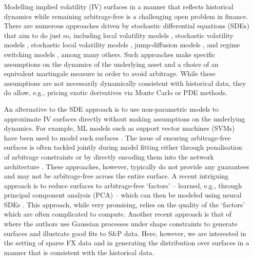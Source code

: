\documentclass[onefignum,onetabnum]{siamonline190516}
\begin{document}
Modelling implied volatility (IV) surfaces %
in a manner that reflects historical dynamics while remaining arbitrage-free is a challenging open problem in finance. There are numerous approaches driven by stochastic differential equations (SDEs) that aim to do just so, including local volatility models  \cite{dupire1994pricing}, stochastic volatility models \cite{heston1993closed,hagan2002managing}, stochastic local volatility models \cite{said1999pricing}, jump-diffusion models \cite{cont2002calibration}, and regime switching models \cite{buffington2002regime}, among many others. Such approaches make specific assumptions on the dynamics of the underlying asset  and a choice of an equivalent martingale measure in order to avoid arbitrage. While these assumptions are not necessarily dynamically consistent with historical data, they do allow, e.g., pricing exotic derivatives via Monte Carlo or PDE methods.

An alternative to the SDE  approach is to use  non-parametric models to approximate IV surfaces directly without making assumptions on the underlying dynamics. For example, ML models such as support vector machines (SVMs) have been used to model such surfaces \cite{zeng2019online}. The issue of ensuring arbitrage-free surfaces is often tackled jointly during model fitting \cite{bergeron2021autoencoders} either through penalisation of arbitrage constraints \cite{ackerer2020deep} or by directly encoding them into the network architecture \cite{zheng2019gated}. These approaches, however, typically do not provide any guarantees and may not be arbitrage-free across the entire surface. A recent intriguing approach \cite{cohen2021arbitrage} is to reduce surfaces to arbitrage-free `factors' -- learned, e.g., through principal component analysis (PCA)  -- which can then be modeled using neural SDEs \cite{li2020scalable}. This approach, while very promising, relies on the quality of the `factors' which are often complicated to compute. Another recent approach is that of \cite{doi:10.1137/20M1381538} where the authors use Gaussian processes under shape constraints to generate surfaces and illustrate good fits to S\&P data. Here, however, we are interested in the  setting of sparse FX data and in generating the distribution over surfaces in a manner that is consistent with the historical data. 
\end{document}
